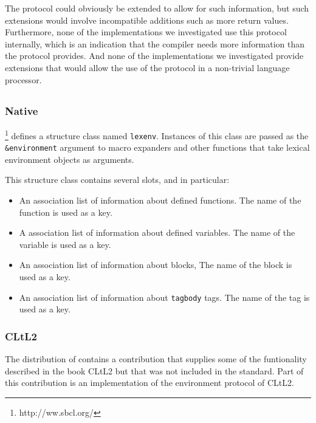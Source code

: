 The protocol could obviously be extended to allow for such
information, but such extensions would involve incompatible additions
such as more return values.  Furthermore, none of the \commonlisp{}
implementations we investigated use this protocol internally, which is
an indication that the compiler needs more information than the
protocol provides.  And none of the implementations we investigated
provide extensions that would allow the use of the protocol in
a non-trivial language processor.

\subsection{\sbcl{}}

\subsubsection{Native}

\sbcl{}%
\footnote{http://ww.sbcl.org/}
defines a structure class named \texttt{lexenv}.  Instances of
this class are passed as the \texttt{\&environment} argument to macro
expanders and other functions that take lexical environment objects as
arguments.

This structure class contains several slots, and in particular:
\begin{itemize}
\item An association list of information about defined functions.
  The name of the function is used as a key.
\item A association list of information about defined variables.
  The name of the variable is used as a key.
\item An association list of information about blocks,
  The name of the block is used as a key.
\item An association list of information about \texttt{tagbody} tags.
  The name of the tag is used as a key.
\end{itemize}

\subsubsection{CLtL2}

The distribution of \sbcl{} contains a contribution that supplies some
of the funtionality described in the book CLtL2 but that was not
included in the \commonlisp{} standard.  Part of this contribution is
an implementation of the environment protocol of CLtL2.

